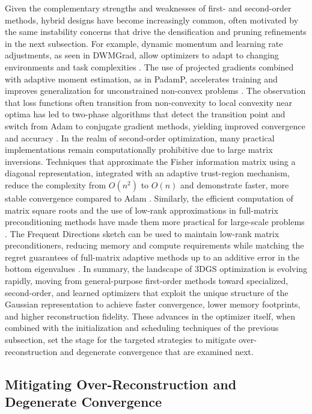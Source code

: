 \documentclass[11pt]{article}
\begin{document}
Given the complementary strengths and weaknesses of first- and second-order methods, hybrid designs have become increasingly common, often motivated by the same instability concerns that drive the densification and pruning refinements in the next subsection. For example, dynamic momentum and learning rate adjustments, as seen in DWMGrad, allow optimizers to adapt to changing environments and task complexities \cite{ref167}. The use of projected gradients combined with adaptive moment estimation, as in PadamP, accelerates training and improves generalization for unconstrained non-convex problems \cite{ref146}. The observation that loss functions often transition from non-convexity to local convexity near optima has led to two-phase algorithms that detect the transition point and switch from Adam to conjugate gradient methods, yielding improved convergence and accuracy \cite{ref168}. In the realm of second-order optimization, many practical implementations remain computationally prohibitive due to large matrix inversions. Techniques that approximate the Fisher information matrix using a diagonal representation, integrated with an adaptive trust-region mechanism, reduce the complexity from \(O(n^2)\) to \(O(n)\) and demonstrate faster, more stable convergence compared to Adam \cite{ref169}. Similarly, the efficient computation of matrix square roots and the use of low-rank approximations in full-matrix preconditioning methods have made them more practical for large-scale problems \cite{ref170}. The Frequent Directions sketch can be used to maintain low-rank matrix preconditioners, reducing memory and compute requirements while matching the regret guarantees of full-matrix adaptive methods up to an additive error in the bottom eigenvalues \cite{ref171}. In summary, the landscape of 3DGS optimization is evolving rapidly, moving from general-purpose first-order methods toward specialized, second-order, and learned optimizers that exploit the unique structure of the Gaussian representation to achieve faster convergence, lower memory footprints, and higher reconstruction fidelity. These advances in the optimizer itself, when combined with the initialization and scheduling techniques of the previous subsection, set the stage for the targeted strategies to mitigate over-reconstruction and degenerate convergence that are examined next.

\subsection{Mitigating Over-Reconstruction and Degenerate Convergence}
\end{document}
